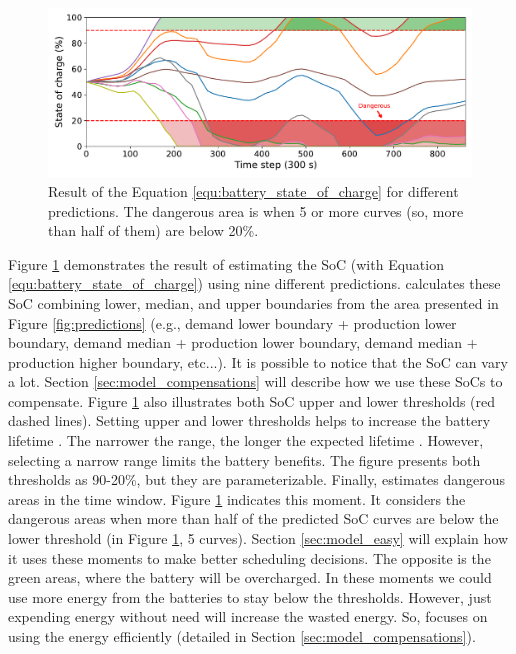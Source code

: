 \begin{figure}[!htb]
    \centering
    \includegraphics[scale=0.5]{Images/Heuristic/state_of_charge.pdf}
    \caption[Result of the Equation \ref{equ:battery_state_of_charge} for different predictions.]{Result of the Equation \ref{equ:battery_state_of_charge} for different predictions. The dangerous area is when 5 or more curves (so, more than half of them) are below 20\%.}
    \label{fig:estimated_state_of_charge}
\end{figure}

Figure \ref{fig:estimated_state_of_charge} demonstrates the result of estimating the SoC (with Equation \ref{equ:battery_state_of_charge}) using nine different predictions. \emph{\systemName} calculates these SoC combining lower, median, and upper boundaries from the area presented in Figure \ref{fig:predictions} (e.g., demand lower boundary + production lower boundary, demand median + production lower boundary, demand median + production higher boundary, etc...). It is possible to notice that the SoC can vary a lot. Section \ref{sec:model_compensations} will describe how we use these SoCs to compensate. Figure \ref{fig:estimated_state_of_charge} also illustrates both SoC upper and lower thresholds (red dashed lines). Setting upper and lower thresholds helps to increase the battery lifetime \cite{xu2016modeling}. The narrower the range, the longer the expected lifetime \cite{xu2016modeling}. However, selecting a narrow range limits the battery benefits. The figure presents both thresholds as 90-20\%, but they are parameterizable. Finally, \emph{\systemName} estimates dangerous areas in the time window. Figure \ref{fig:estimated_state_of_charge} indicates this moment. It considers the dangerous areas when more than half of the predicted SoC curves are below the lower threshold (in Figure \ref{fig:estimated_state_of_charge}, 5 curves). Section \ref{sec:model_easy} will explain how it uses these moments to make better scheduling decisions. The opposite is the green areas, where the battery will be overcharged. In these moments we could use more energy from the batteries to stay below the thresholds. However, just expending energy without need will increase the wasted energy. So, \emph{\systemName} focuses on using the energy efficiently (detailed in Section \ref{sec:model_compensations}). 

